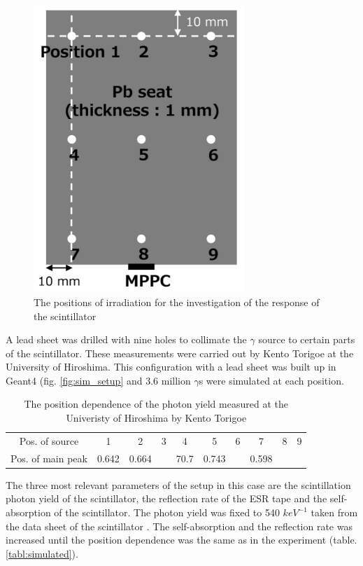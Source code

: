 \documentclass[12pt, a4paper,titlepage]{article}
\numberwithin{equation}{section}
\numberwithin{figure}{section}
\begin{document}
\begin{figure}[h!]
\centering
\includegraphics[width=80.0mm]{images/positions.png}
\caption{The positions of irradiation for the investigation of the response of the scintillator}
\end{figure}

A lead sheet was drilled with nine holes to collimate the $\gamma$ source to certain parts of the scintillator. These measurements were carried out by Kento Torigoe at the University of Hiroshima. This configuration with a lead sheet was built up in Geant4 (fig. \ref{fig:sim_setup} and 3.6 million $\gamma$s were simulated at each position. 

\begin{table}[h!]
\begin{center}
\begin{tabular}{ |c|c|c|c|c|c|c|c|c|c| } 
 \hline
  Pos. of source & 1 & 2 & 3 & 4 & 5 & 6 & 7 & 8 & 9 \\ 
  Pos. of main peak & 0.642 & 0.664 & & 70.7 & 0.743 & & 0.598 & &  \\ 
 \hline
\end{tabular}
\label{tab:exp_sim}
\caption{The position dependence of the photon yield measured at the Univeristy of Hiroshima by Kento Torigoe}
\end{center}
\end{table}

The three most relevant parameters of the setup in this case are the scintillation photon yield of the scintillator, the reflection rate of the ESR tape and the self-absorption of the scintillator. The photon yield was fixed to 540 $keV^{-1}$ taken from the data sheet of the scintillator \cite{scinti}. The self-absorption and the reflection rate was increased until the position dependence was the same as in the experiment (table. \ref{tabl:simulated}). 
\end{document}
